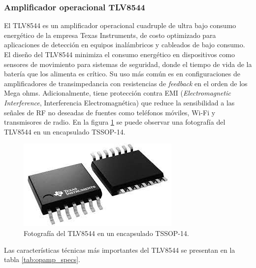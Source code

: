 \subsubsection{Amplificador operacional TLV8544}
El TLV8544 es un amplificador operacional cuadruple de ultra bajo consumo energético de la empresa Texas Instruments, de costo optimizado para aplicaciones de detección en equipos inalámbricos y cableados de bajo consumo. El diseño del TLV8544 minimiza el consumo energético en dispositivos como sensores de movimiento para sistemas de seguridad, donde el tiempo de vida de la batería que los alimenta es crítico. Su uso más común es en configuraciones de amplificadores de transimpedancia con resistencias de \textit{feedback} en el orden de los Mega ohms. Adicionalmente, tiene protección contra EMI (\textit{Electromagnetic Interference}, Interferencia Electromagnética) que reduce la sensibilidad a las señales de RF no deseadas de fuentes como teléfonos móviles, Wi-Fi y transmisores de radio. En la figura \ref{fig:opamp_photo} se puede observar una fotografía del TLV8544 en un encapsulado TSSOP-14.

\begin{figure}[h]
	\centering
	\includegraphics[scale=0.4]{./Figures/opamp_photo.jpeg}
	\caption{Fotografía del TLV8544 en un encapsulado TSSOP-14\protect\footnotemark.}
	\label{fig:opamp_photo}
\end{figure}

Las características técnicas más importantes del TLV8544 se presentan en la tabla \ref{tab:opamp_specs}.

